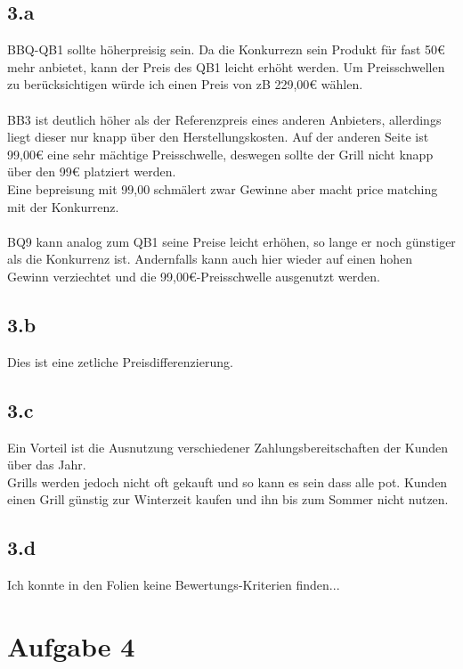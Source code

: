 \subsection*{3.a}
    BBQ-QB1 sollte höherpreisig sein. Da die Konkurrezn sein Produkt für fast 50€ mehr anbietet, kann der Preis des QB1 leicht erhöht werden. Um Preisschwellen zu berücksichtigen würde ich einen Preis von zB 229,00€ wählen. \\
    \ \\
    BB3 ist deutlich höher als der Referenzpreis eines anderen Anbieters, allerdings liegt dieser nur knapp über den Herstellungskosten. Auf der anderen Seite ist 99,00€ eine sehr mächtige Preisschwelle, deswegen sollte der Grill nicht knapp über den 99€ platziert werden. \\
    Eine bepreisung mit 99,00 schmälert zwar Gewinne aber macht price matching mit der Konkurrenz. \\
    \ \\
    BQ9 kann analog zum QB1 seine Preise leicht erhöhen, so lange er noch günstiger als die Konkurrenz ist. Andernfalls kann auch hier wieder auf einen hohen Gewinn verziechtet und die 99,00€-Preisschwelle ausgenutzt werden. \\

\subsection*{3.b}
    Dies ist eine zetliche Preisdifferenzierung.

\subsection*{3.c}
    Ein Vorteil ist die Ausnutzung verschiedener Zahlungsbereitschaften der Kunden über das Jahr. \\
    Grills werden jedoch nicht oft gekauft und so kann es sein dass alle pot. Kunden einen Grill günstig zur Winterzeit kaufen und ihn bis zum Sommer nicht nutzen. \\

\subsection*{3.d}
    Ich konnte in den Folien keine Bewertungs-Kriterien finden...



\section*{Aufgabe 4}
